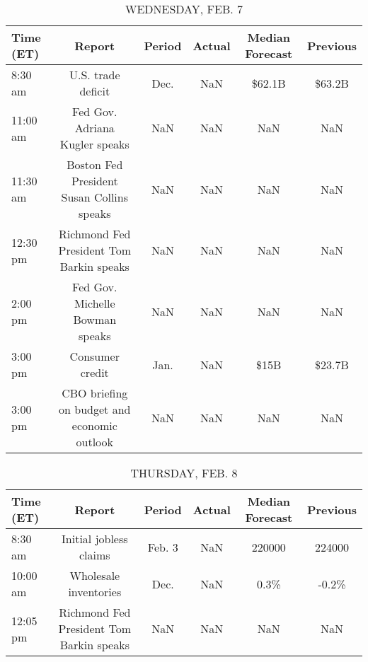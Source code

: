 \documentclass{article}%
\begin{document}
\begin{table}[htbp]%
\caption{WEDNESDAY, FEB. 7}%
\centering%
\begin{adjustbox}{width=1\textwidth}%
\begin{tabular}{lccccc}
\toprule
Time (ET) &                                      Report & Period & Actual & Median Forecast & Previous \\
\midrule
  8:30 am &                          U.S. trade deficit &   Dec. &    NaN &          \$62.1B &   \$63.2B \\
 11:00 am &              Fed Gov. Adriana Kugler speaks &    NaN &    NaN &             NaN &      NaN \\
 11:30 am &   Boston Fed President Susan Collins speaks &    NaN &    NaN &             NaN &      NaN \\
 12:30 pm &    Richmond Fed President Tom Barkin speaks &    NaN &    NaN &             NaN &      NaN \\
  2:00 pm &             Fed Gov. Michelle Bowman speaks &    NaN &    NaN &             NaN &      NaN \\
  3:00 pm &                             Consumer credit &   Jan. &    NaN &            \$15B &   \$23.7B \\
  3:00 pm & CBO briefing on budget and economic outlook &    NaN &    NaN &             NaN &      NaN \\
\bottomrule
\end{tabular}
%
\end{adjustbox}%
\end{table}

%


\begin{table}[htbp]%
\caption{THURSDAY, FEB. 8}%
\centering%
\begin{adjustbox}{width=1\textwidth}%
\begin{tabular}{lccccc}
\toprule
Time (ET) &                                   Report & Period & Actual & Median Forecast & Previous \\
\midrule
  8:30 am &                   Initial jobless claims & Feb. 3 &    NaN &          220000 &   224000 \\
 10:00 am &                    Wholesale inventories &   Dec. &    NaN &            0.3\% &    -0.2\% \\
 12:05 pm & Richmond Fed President Tom Barkin speaks &    NaN &    NaN &             NaN &      NaN \\
\bottomrule
\end{tabular}
%
\end{adjustbox}%
\end{table}
\end{document}

